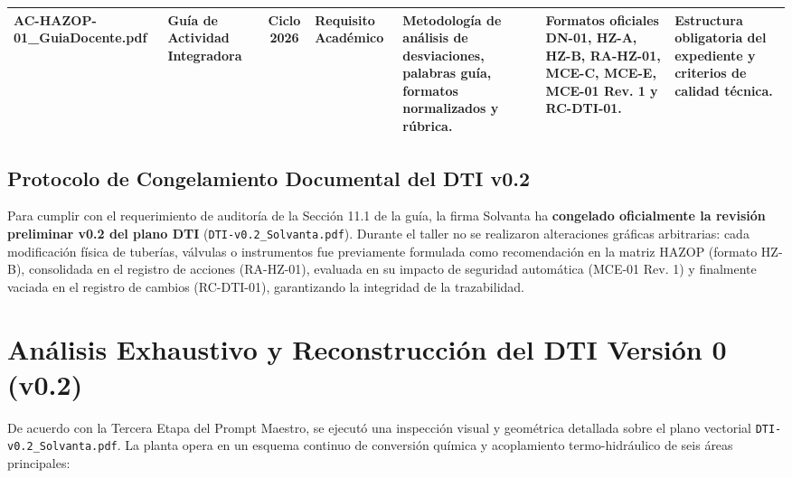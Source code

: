 \documentclass[10pt,letterpaper]{article}
\begin{document}
\begin{landscape}
\begin{xltabular}{\linewidth}{|p{3.8cm}|p{2.4cm}|c|p{2.2cm}|>{\raggedright\arraybackslash}X|>{\raggedright\arraybackslash}X|p{3.0cm}|}
AC-HAZOP-01\_\allowbreak GuiaDocente.pdf & Guía de Actividad Integradora & Ciclo 2026 & Requisito Académico & Metodología de análisis de desviaciones, palabras guía, formatos normalizados y rúbrica. & Formatos oficiales DN-01, HZ-A, HZ-B, RA-HZ-01, MCE-C, MCE-E, MCE-01 Rev. 1 y RC-DTI-01. & Estructura obligatoria del expediente y criterios de calidad técnica. \\ \hline
\end{xltabular}
\end{landscape}

\subsection{Protocolo de Congelamiento Documental del DTI v0.2}
Para cumplir con el requerimiento de auditoría de la Sección 11.1 de la guía, la firma Solvanta ha \textbf{congelado oficialmente la revisión preliminar v0.2 del plano DTI} (\texttt{DTI-v0.2\_Solvanta.pdf}). Durante el taller no se realizaron alteraciones gráficas arbitrarias: cada modificación física de tuberías, válvulas o instrumentos fue previamente formulada como recomendación en la matriz HAZOP (formato HZ-B), consolidada en el registro de acciones (RA-HZ-01), evaluada en su impacto de seguridad automática (MCE-01 Rev. 1) y finalmente vaciada en el registro de cambios (RC-DTI-01), garantizando la integridad de la trazabilidad.
\newpage

\section{Análisis Exhaustivo y Reconstrucción del DTI Versión 0 (v0.2)}
De acuerdo con la Tercera Etapa del Prompt Maestro, se ejecutó una inspección visual y geométrica detallada sobre el plano vectorial \texttt{DTI-v0.2\_Solvanta.pdf}. La planta opera en un esquema continuo de conversión química y acoplamiento termo-hidráulico de seis áreas principales:
\end{document}
